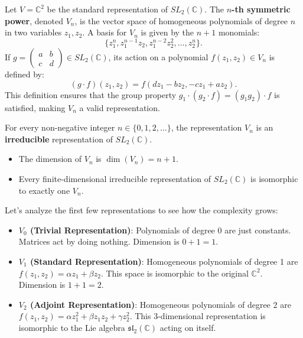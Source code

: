 \begin{definition}
Let $V = \mathbb{C}^2$ be the standard representation of $SL_2(\mathbb{C})$. The \textbf{$n$-th symmetric power}, denoted $V_n$, is the vector space of homogeneous polynomials of degree $n$ in two variables $z_1, z_2$. 
A basis for $V_n$ is given by the $n+1$ monomials:
\[ \{z_1^n, z_1^{n-1}z_2, z_1^{n-2}z_2^2, \dots, z_2^n\}. \]
If $g = \begin{pmatrix} a & b \\ c & d \end{pmatrix} \in SL_2(\mathbb{C})$, its action on a polynomial $f(z_1, z_2) \in V_n$ is defined by:
\[ (g \cdot f)(z_1, z_2) = f(d z_1 - b z_2, -c z_1 + a z_2). \]
This definition ensures that the group property $g_1 \cdot (g_2 \cdot f) = (g_1 g_2) \cdot f$ is satisfied, making $V_n$ a valid representation.
\end{definition}

\begin{theorem}
For every non-negative integer $n \in \{0, 1, 2, \dots\}$, the representation $V_n$ is an \textbf{irreducible} representation of $SL_2(\mathbb{C})$. 
\begin{itemize}
    \item The dimension of $V_n$ is $\dim(V_n) = n+1$.
    \item Every finite-dimensional irreducible representation of $SL_2(\mathbb{C})$ is isomorphic to exactly one $V_n$.
\end{itemize}
\end{theorem}

\begin{example}
Let's analyze the first few representations to see how the complexity grows:
\begin{itemize}
    \item \textbf{$V_0$ (Trivial Representation)}: Polynomials of degree 0 are just constants. Matrices act by doing nothing. Dimension is $0+1=1$.
    \item \textbf{$V_1$ (Standard Representation)}: Homogeneous polynomials of degree 1 are $f(z_1, z_2) = \alpha z_1 + \beta z_2$. This space is isomorphic to the original $\mathbb{C}^2$. Dimension is $1+1=2$.
    \item \textbf{$V_2$ (Adjoint Representation)}: Homogeneous polynomials of degree 2 are $f(z_1, z_2) = \alpha z_1^2 + \beta z_1 z_2 + \gamma z_2^2$. This 3-dimensional representation is isomorphic to the Lie algebra $\mathfrak{sl}_2(\mathbb{C})$ acting on itself.
\end{itemize}
\end{example}

